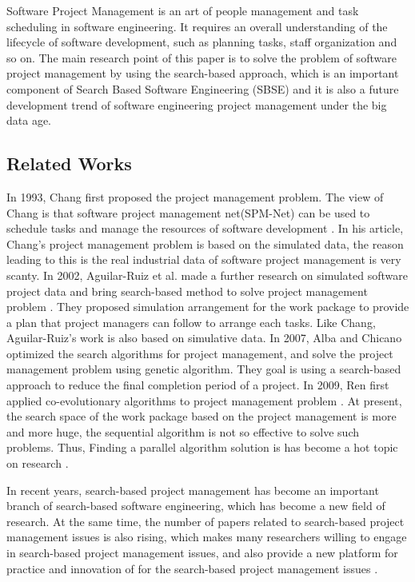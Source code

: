 Software Project Management is an art of people management and task scheduling
in software engineering. It requires an overall understanding of the lifecycle
of software development, such as planning tasks, staff organization and so
on. The main research point of this paper is to solve the problem of software
project management by using the search-based approach, which is an important
component of Search Based Software Engineering (SBSE) and it is also a future
development trend of software engineering project management under the big data
age.

\subsection{Related Works}
%
In 1993, Chang first proposed the project management problem. The view of Chang
is that software project management net(SPM-Net) can be used to schedule tasks
and manage the resources of software development \cite{chang}. In his article,
Chang's project management problem is based on the simulated data, the reason
leading to this is the real industrial data of software project management is
very scanty. In 2002, Aguilar-Ruiz et al. made a further research on simulated
software project data and bring search-based method to solve project management
problem \cite{alba}. They proposed simulation arrangement for the work package
to provide a plan that project managers can follow to arrange each tasks. Like
Chang, Aguilar-Ruiz's work is also based on simulative data. In 2007, Alba and
Chicano optimized the search algorithms for project management, and solve the
project management problem using genetic algorithm. They goal is using a
search-based approach to reduce the final completion period of a project. In
2009, Ren first applied co-evolutionary algorithms to project management problem
\cite{ren}. At present, the search space of the work package based on the
project management is more and more huge, the sequential algorithm is not so
effective to solve such problems. Thus, Finding a parallel algorithm solution is
has become a hot topic on research \cite{pentico}.

In recent years, search-based project management has become an important branch
of search-based software engineering, which has become a new field of
research. At the same time, the number of papers related to search-based project
management issues is also rising, which makes many researchers willing to engage
in search-based project management issues, and also provide a new platform for
practice and innovation of for the search-based project management issues
\cite{penta}.

